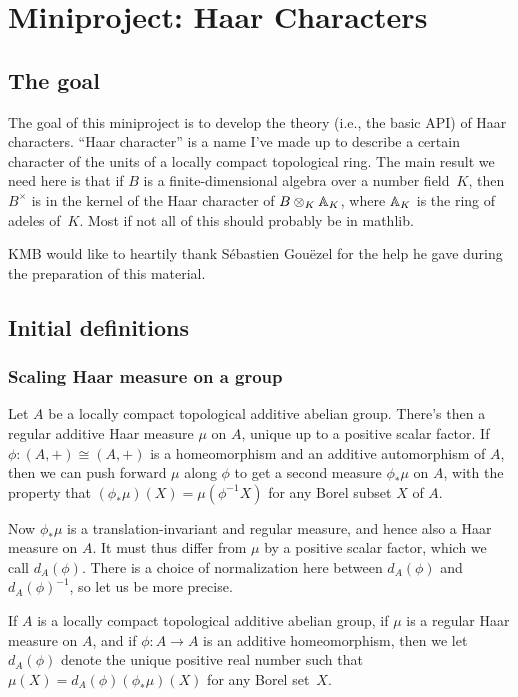 \chapter{Miniproject: Haar Characters}\label{Haar_char_project}

\section{The goal}

The goal of this miniproject is to develop the theory (i.e., the basic API) of Haar characters.
``Haar character'' is a name I've made up to describe a certain character of the units of a locally
compact topological ring. The main result we need here is that if $B$ is a finite-dimensional
algebra over a number field~$K$, then $B^\times$ is in the kernel of the Haar character
of $B\otimes_K\mathbb{A}_K$, where $\mathbb{A}_K$ is the ring of adeles of~$K$. Most if not all of this
should probably be in mathlib.

KMB would like to heartily thank S\'ebastien Gou\"ezel for the help he gave during the preparation
of this material.

\section{Initial definitions}

\subsection{Scaling Haar measure on a group}

Let $A$ be a locally compact topological additive abelian group. There's then a regular additive
Haar measure $\mu$ on $A$, unique up to a positive scalar factor. If $\phi:(A,+)\cong(A,+)$ is a
homeomorphism and an additive automorphism of $A$, then we can push forward $\mu$
along $\phi$ to get a second measure $\phi_*\mu$ on $A$, with the property that
$(\phi_*\mu)(X)=\mu(\phi^{-1}X)$ for any Borel subset $X$ of $A$.

Now $\phi_*\mu$ is a translation-invariant and regular measure,
and hence also a Haar measure on $A.$ It must thus differ from
$\mu$ by a positive scalar factor, which we call $d_A(\phi)$.
There is a choice of normalization here between $d_A(\phi)$
and $d_A(\phi)^{-1}$, so let us be more precise.

\begin{definition}
  \label{MeasureTheory.addEquivAddHaarChar}
  \leanok
  If $A$ is a locally compact topological additive abelian group,
  if $\mu$ is a regular Haar measure on $A$, and if $\phi:A\to A$ is an
  additive homeomorphism, then we let $d_A(\phi)$ denote the unique positive
  real number such that $\mu(X)=d_A(\phi)(\phi_*\mu)(X)$ for any Borel set~$X$.
\end{definition}

